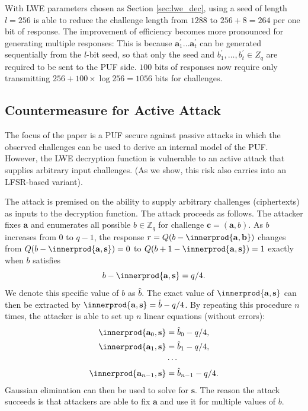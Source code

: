 With LWE parameters chosen as Section \ref{sec:lwe_dec}, using a seed of length $l=256$ is able to reduce the challenge length from $1288$ to $256+8=264$ per one bit of response. 
The improvement of efficiency becomes more pronounced for generating multiple responses:
This is because $\mathbf{a}^\prime_1 \ldots \mathbf{a}^\prime_t$ can be generated sequentially from the $l$-bit seed, so that only the seed and $b^\prime_1,\ldots, b^\prime_t \in Z_q$ are required to be sent to the PUF side. 
$100$ bits of responses now require only transmitting $256+100\times\log 256 = 1056$ bits for challenges.

\subsection{Countermeasure for Active Attack}
\label{sec:counter}
The focus of the paper is a PUF secure against passive attacks in which the observed challenges can be used to derive an internal model of the PUF. 
However, the LWE decryption function is vulnerable to an active attack that supplies arbitrary input challenges. 
(As we show, this risk also carries into an LFSR-based variant). 

The attack is premised on the ability to supply arbitrary challenges (ciphertexts) as inputs to the decryption function. 
The attack proceeds as follows. 
The attacker fixes $\mathbf{a}$ and enumerates all possible $b\in \mathbb{Z}_q$ for challenge $\mathbf{c} = (\mathbf{a},b)$.
As $b$ increases from $0$ to $q-1$, the response $r = Q(b-\innerprod{\mathbf{a},\mathbf{b}})$ changes from  $Q(b-\innerprod{\mathbf{a},\mathbf{s}}) = 0$ to $Q(b+1-\innerprod{\mathbf{a},\mathbf{s}}) = 1$ exactly when $b$ satisfies
\begin{equation*}
b-\innerprod{\mathbf{a},\mathbf{s}} = q/4.
\end{equation*}
We denote this specific value of $b$ as $\hat{b}$. 
The exact value of $\innerprod{\mathbf{a},\mathbf{s}}$ can then be extracted by $\innerprod{\mathbf{a},\mathbf{s}} = \hat{b} - q/4$. 
By repeating this procedure $n$ times, the attacker is able to set up $n$ linear equations (without errors):  
\begin{align*}
\label{eq:secret_eqs}
    \innerprod{\mathbf{a}_0,\mathbf{s}} &= \hat{b}_0 - q/4, \\
    \innerprod{\mathbf{a}_1,\mathbf{s}} &= \hat{b}_1 - q/4, \\
    & \cdots \\
    \innerprod{\mathbf{a}_{n-1},\mathbf{s}} &= \hat{b}_{n-1} - q/4.
\end{align*}
Gaussian elimination can then be used to solve for $\mathbf{s}$. 
The reason the attack succeeds is that attackers are able to fix $\mathbf{a}$ and use it for multiple values of $b$. 

